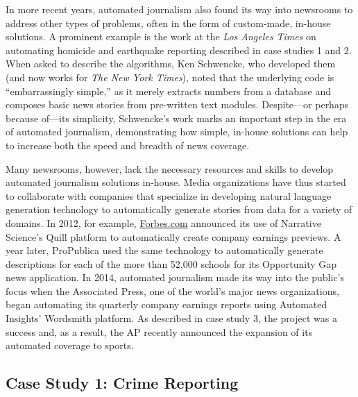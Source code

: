 \documentclass[notoc, symmetric, nobib, nols]{towcenter-guideto-book}
\begin{document}
In more recent years, automated journalism also found its way into newsrooms to address other types of problems, often in the form of custom-made, in-house solutions. A prominent example is the work at the \textit{Los Angeles Times} on automating homicide and earthquake reporting described in case studies 1 and 2. When asked to describe the algorithms, Ken Schwencke, who developed them (and now works for \textit{The New York Times}), noted that the underlying code is ``embarrassingly simple,'' as it merely extracts numbers from a database and composes basic news stories from pre-written text modules.\autocite{young15} Despite---or perhaps because of---its simplicity, Schwencke's work marks an important step in the era of automated journalism, demonstrating how simple, in-house solutions can help to increase both the speed and breadth of news coverage. 


Many newsrooms, however, lack the necessary resources and skills to develop automated journalism solutions in-house. Media organizations have thus started to collaborate with companies that specialize in developing natural language generation technology to automatically generate stories from data for a variety of domains. In 2012, for example, \href{http://Forbes.com}{Forbes.com} announced its use of Narrative Science's Quill platform to automatically create company earnings previews.\autocite{levy12} A year later, ProPublica used the same technology to automatically generate descriptions for each of the more than 52,000 schools for its Opportunity Gap news application.\autocite{klein13} In 2014, automated journalism made its way into the public's focus when the Associated Press, one of the world's major news organizations, began automating its quarterly company earnings reports using Automated Insights' Wordsmith platform. As described in case study 3, the project was a success and, as a result, the AP recently announced the expansion of its automated coverage to sports.\autocite{ap15} 

\subsection{Case Study 1: Crime Reporting}
\end{document}
